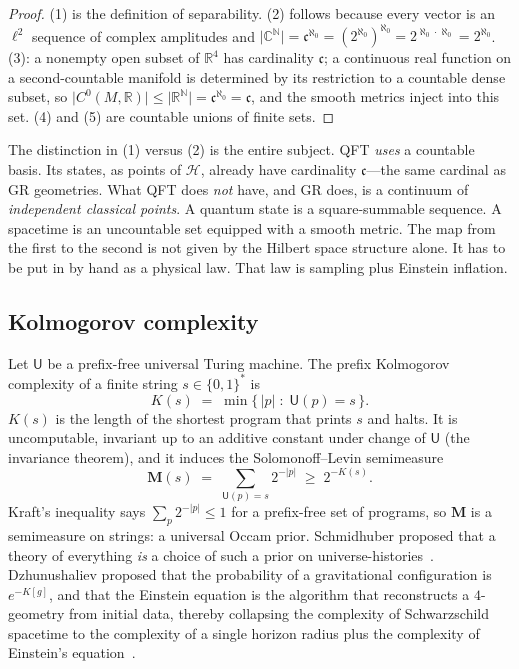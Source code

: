 \documentclass[11pt,a4paper]{article}
\theoremstyle{plain}
\theoremstyle{definition}
\theoremstyle{remark}
\newcommand{\N}{\mathbb{N}}
\newcommand{\R}{\mathbb{R}}
\newcommand{\C}{\mathbb{C}}
\newcommand{\alef}{\aleph_{0}}
\newcommand{\cont}{\mathfrak{c}}
\newcommand{\Hil}{\mathcal{H}}
\newcommand{\abs}[1]{\lvert#1\rvert}
\begin{document}
\begin{proof}
(1) is the definition of separability.
(2) follows because every vector is an $\ell^{2}$ sequence of complex amplitudes and $\abs{\C^{\N}}=\cont^{\alef}=(2^{\alef})^{\alef}=2^{\alef\cdot\alef}=2^{\alef}$.
(3): a nonempty open subset of $\R^{4}$ has cardinality $\cont$; a continuous real function on a second-countable manifold is determined by its restriction to a countable dense subset, so $\abs{C^{0}(M,\R)}\le\abs{\R^{\N}}=\cont^{\alef}=\cont$, and the smooth metrics inject into this set.
(4) and (5) are countable unions of finite sets.
\end{proof}

The distinction in (1) versus (2) is the entire subject.
QFT \emph{uses} a countable basis.
Its states, as points of $\Hil$, already have cardinality $\cont$---the same cardinal as GR geometries.
What QFT does \emph{not} have, and GR does, is a continuum of \emph{independent classical points}.
A quantum state is a square-summable sequence.
A spacetime is an uncountable set equipped with a smooth metric.
The map from the first to the second is not given by the Hilbert space structure alone.
It has to be put in by hand as a physical law.
That law is sampling plus Einstein inflation.

\subsection{Kolmogorov complexity}

Let $\mathsf{U}$ be a prefix-free universal Turing machine.
The prefix Kolmogorov complexity of a finite string $s\in\{0,1\}^{*}$ is~\cite{kolmogorov1965,chaitin1969,solomonoff1964,li2008}
\begin{equation}
  K(s) \;=\; \min\bigl\{\,\abs{p}\;:\; \mathsf{U}(p)=s\,\bigr\}.
\end{equation}
$K(s)$ is the length of the shortest program that prints $s$ and halts.
It is uncomputable, invariant up to an additive constant under change of $\mathsf{U}$ (the invariance theorem), and it induces the Solomonoff--Levin semimeasure~\cite{solomonoff1964,levin1974}
\begin{equation}
  \mathbf{M}(s) \;=\; \sum_{\mathsf{U}(p)=s} 2^{-\abs{p}} \;\ge\; 2^{-K(s)}.
  \label{eq:solomonoff}
\end{equation}
Kraft's inequality says $\sum_{p} 2^{-\abs{p}}\le 1$ for a prefix-free set of programs, so $\mathbf{M}$ is a semimeasure on strings: a universal Occam prior.
Schmidhuber proposed that a theory of everything \emph{is} a choice of such a prior on universe-histories~\cite{schmidhuber2000}.
Dzhunushaliev proposed that the probability of a gravitational configuration is $e^{-K[g]}$, and that the Einstein equation is the algorithm that reconstructs a $4$-geometry from initial data, thereby collapsing the complexity of Schwarzschild spacetime to the complexity of a single horizon radius plus the complexity of Einstein's equation~\cite{dzhunushaliev1998,dzhunushaliev2002}.
\end{document}
